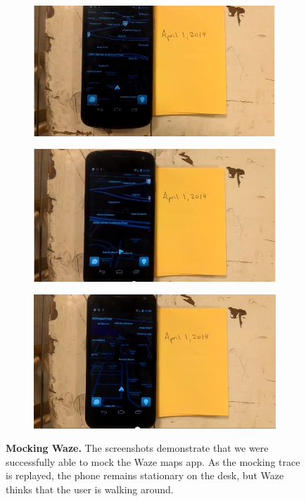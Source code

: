 \begin{figure}[t]

\begin{subfigure}[t]{0.33\textwidth}
\includegraphics[width=\textwidth]{./figures/apps/waze/waze1.png}
\caption{}
\end{subfigure}%
\begin{subfigure}[t]{0.33\textwidth}
\includegraphics[width=\textwidth]{./figures/apps/waze/waze2.png}
\caption{}
\end{subfigure}%
\begin{subfigure}[t]{0.33\textwidth}
\includegraphics[width=\textwidth]{./figures/apps/waze/waze3.png}
\caption{}
\end{subfigure}%

\caption{\textbf{Mocking Waze.} The screenshots demonstrate that we were
successfully able to mock the Waze maps app. As the mocking trace is
replayed, the phone remains stationary on the desk, but Waze thinks that the
user is walking around.}

\label{fig-mocking-waze}

\end{figure}
